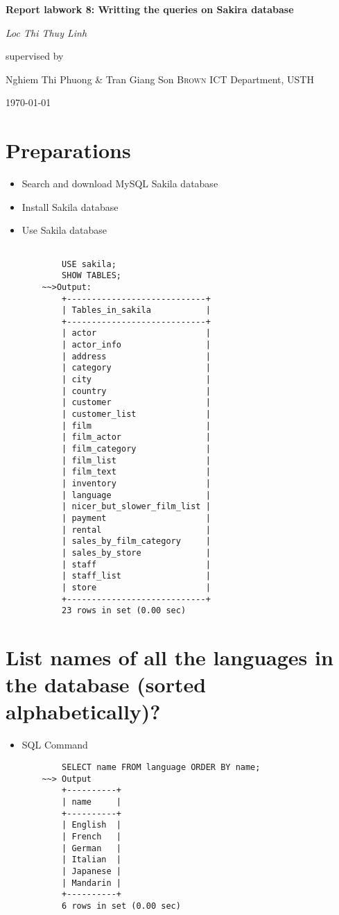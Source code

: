 \documentclass[13pt,a4paper]{report}
\begin{document}
\begin{titlepage}
	\centering
	\vspace{2cm}
	{\huge\bfseries Report labwork 8: Writting the queries on Sakira database\par}
	\vspace{2cm}
	{\Large\itshape Loc Thi Thuy Linh\par}
	\vfill
	supervised by\par
	Nghiem Thi Phuong \& Tran Giang Son \textsc{Brown}
	ICT Department, USTH\par
	\vfill
	{\large \today\par}
\end{titlepage}

\section{ Preparations }
\begin{itemize}
	\item Search and download MySQL Sakila database
	\item Install Sakila database
	\item Use Sakila database
	\begin{lstlisting}
	 
		USE sakila;
		SHOW TABLES;
	~~>Output:
		+----------------------------+
		| Tables_in_sakila           |
		+----------------------------+
		| actor                      |
		| actor_info                 |
		| address                    |
		| category                   |
		| city                       |
		| country                    |
		| customer                   |
		| customer_list              |
		| film                       |
		| film_actor                 |
		| film_category              |
		| film_list                  |
		| film_text                  |
		| inventory                  |
		| language                   |
		| nicer_but_slower_film_list |
		| payment                    |
		| rental                     |
		| sales_by_film_category     |
		| sales_by_store             |
		| staff                      |
		| staff_list                 |
		| store                      |
		+----------------------------+
		23 rows in set (0.00 sec)

	\end{lstlisting}

\end{itemize}

\section{ List names of all the languages in the database (sorted alphabetically)? }
\begin{itemize}
	\item SQL Command
	\begin{lstlisting}
		SELECT name FROM language ORDER BY name;
	~~> Output
		+----------+
		| name     |
		+----------+
		| English  |
		| French   |
		| German   |
		| Italian  |
		| Japanese |
		| Mandarin |
		+----------+
		6 rows in set (0.00 sec)

	\end{lstlisting}
\end{itemize}
\end{document}
